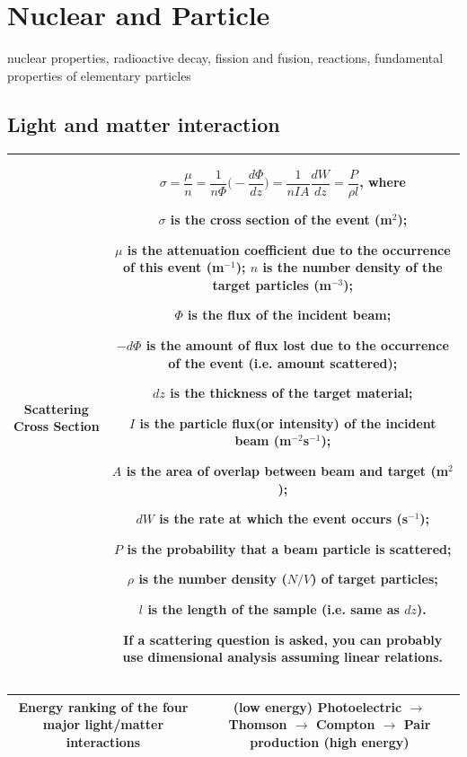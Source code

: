 
\section{Nuclear and Particle}
nuclear properties, radioactive decay, fission
and fusion, reactions, fundamental
properties of elementary particles



\subsection{Light and matter interaction} 
\center
\begin{tabular}{|c|c|}
\hline

Scattering Cross Section & \begin{minipage}{.7 \textwidth}
\small

$\sigma = \dfrac{\mu}{n} = \dfrac{1}{n\Phi}\Big(- \dfrac{d\Phi}{dz}\Big) = \dfrac{1}{nIA}\dfrac{dW}{dz} = \dfrac{P}{\rho l}$, where 

$\sigma$ is the cross section of the event (m$^2$);  

$\mu$ is the attenuation coefficient due to the occurrence of this event (m$^{-1}$); $n$ is the number density of the target particles (m$^{-3}$);

$\Phi$ is the flux of the incident beam;

$-d\Phi$ is the amount of flux lost due to the occurrence of the event (i.e. amount scattered);

$dz$ is the thickness of the target material;

$I$ is the particle flux(or intensity) of the incident beam (m$^{-2}$s$^{-1}$);

$A$ is the area of overlap between beam and target (m$^2$);

$dW$ is the rate at which the event occurs (s$^{-1}$);

$P$ is the probability that a beam particle is scattered;

$\rho$ is the number density ($N/V$) of target particles;

$l$ is the length of the sample (i.e. same as $dz$).

\textbf{If a scattering question is asked, you can probably use dimensional analysis assuming linear relations.}
\end{minipage}

\\ \hline
\end{tabular}


\begin{tabular}{|c|c|}
\hline
\begin{minipage}{.3\textwidth}
Energy ranking of the four major light/matter interactions
\end{minipage}

&
\begin{minipage}{.6\textwidth}

(low energy) Photoelectric $\rightarrow$ Thomson $\rightarrow$ Compton $\rightarrow$ Pair production (high energy)
\end{minipage}

\\ \hline
\end{tabular}
\flushleft


